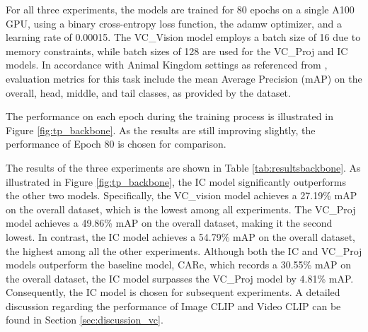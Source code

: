 For all three experiments, the models are trained for 80 epochs on a single A100 GPU, using a binary cross-entropy loss function, the adamw optimizer, and a learning rate of 0.00015. The VC\_Vision model employs a batch size of 16 due to memory constraints, while batch sizes of 128 are used for the VC\_Proj and IC models. In accordance with Animal Kingdom settings as referenced from \parencite{ng2022animal}, evaluation metrics for this task include the mean Average Precision (mAP) on the overall, head, middle, and tail classes, as provided by the dataset. 


The performance on each epoch during the training process is illustrated in Figure \ref{fig:tp_backbone}. As the results are still improving slightly, the performance of Epoch 80 is chosen for comparison. 

The results of the three experiments are shown in Table \ref{tab:resultsbackbone}. As illustrated in Figure \ref{fig:tp_backbone}, the IC model significantly outperforms the other two models. Specifically, the VC\_vision model achieves a 27.19\% mAP on the overall dataset, which is the lowest among all experiments. The VC\_Proj model achieves a 49.86\% mAP on the overall dataset, making it the second lowest. In contrast, the IC model achieves a 54.79\% mAP on the overall dataset, the highest among all the other experiments. Although both the IC and VC\_Proj models outperform the baseline model, CARe, which records a 30.55\% mAP on the overall dataset, the IC model surpasses the VC\_Proj model by 4.81\% mAP. Consequently, the IC model is chosen for subsequent experiments. A detailed discussion regarding the performance of Image CLIP and Video CLIP can be found in Section \ref{sec:discussion_vc}.

